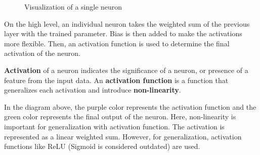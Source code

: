 \documentclass[../../main.tex]{subfiles}
\begin{document}
\begin{figure}[H]
\centering
{}
\caption{Visualization of a single neuron}
\end{figure}

On the high level, an individual neuron takes the weighted
sum of the previous layer with the trained parameter.
Bias is then added to make the activations more flexible.
Then, an activation function is used to determine the final
activation of the neuron.

\begin{definition}{}{}
\textbf{Activation} of a neuron indicates the significance of
a neuron, or presence of a feature from the input data.
An \textbf{activation function} is a function that generalizes
each activation and introduce \textbf{non-linearity}.
\end{definition}

In the diagram above, the purple color represents the activation
function and the green color represents the final output of
the neuron. Here, non-linearity is important for generalization
with activation function. The activation is represented as
a linear weighted sum. However, for generalization, activation
functions like ReLU (Sigmoid is considered outdated) are used.
\end{document}
